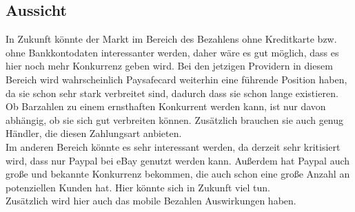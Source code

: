 \subsection{Aussicht}
In Zukunft könnte der Markt im Bereich des Bezahlens ohne Kreditkarte bzw. ohne Bankkontodaten interessanter werden, daher wäre es gut möglich, dass es hier noch mehr Konkurrenz geben wird. Bei den jetzigen Providern in diesem Bereich wird wahrscheinlich Paysafecard weiterhin eine führende Position haben, da sie schon sehr stark verbreitet sind, dadurch dass sie schon lange existieren. Ob Barzahlen zu einem ernsthaften Konkurrent werden kann, ist nur davon abhängig, ob sie sich gut verbreiten können. Zusätzlich brauchen sie auch genug Händler, die diesen Zahlungsart anbieten.\\

Im anderen Bereich könnte es sehr interessant werden, da derzeit sehr kritisiert wird, dass nur Paypal bei eBay genutzt werden kann. Außerdem hat Paypal auch große und bekannte Konkurrenz bekommen, die auch schon eine große Anzahl an potenziellen Kunden hat. Hier könnte sich in Zukunft viel tun.\\

Zusätzlich wird hier auch das mobile Bezahlen Auswirkungen haben.